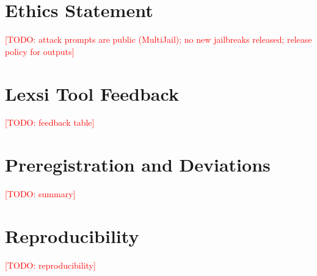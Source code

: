 \documentclass[11pt]{article}
\newcommand{\todo}[1]{\textcolor{red}{[TODO: #1]}}
\begin{document}
\section*{Ethics Statement}
\todo{attack prompts are public (MultiJail); no new jailbreaks released; release policy for outputs}

\nocite{*} %


\appendix
\section{Lexsi Tool Feedback}
\todo{feedback table}

\section{Preregistration and Deviations}
\todo{summary}

\section{Reproducibility}
\todo{reproducibility}
\end{document}
